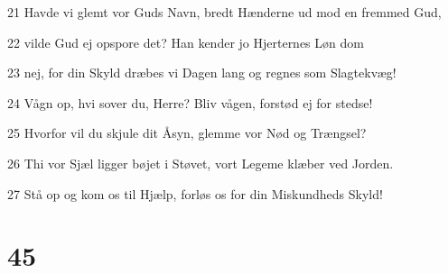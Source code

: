 \par 21 Havde vi glemt vor Guds Navn, bredt Hænderne ud mod en fremmed Gud,
\par 22 vilde Gud ej opspore det? Han kender jo Hjerternes Løn dom
\par 23 nej, for din Skyld dræbes vi Dagen lang og regnes som Slagtekvæg!
\par 24 Vågn op, hvi sover du, Herre? Bliv vågen, forstød ej for stedse!
\par 25 Hvorfor vil du skjule dit Åsyn, glemme vor Nød og Trængsel?
\par 26 Thi vor Sjæl ligger bøjet i Støvet, vort Legeme klæber ved Jorden.
\par 27 Stå op og kom os til Hjælp, forløs os for din Miskundheds Skyld!

\chapter{45}

